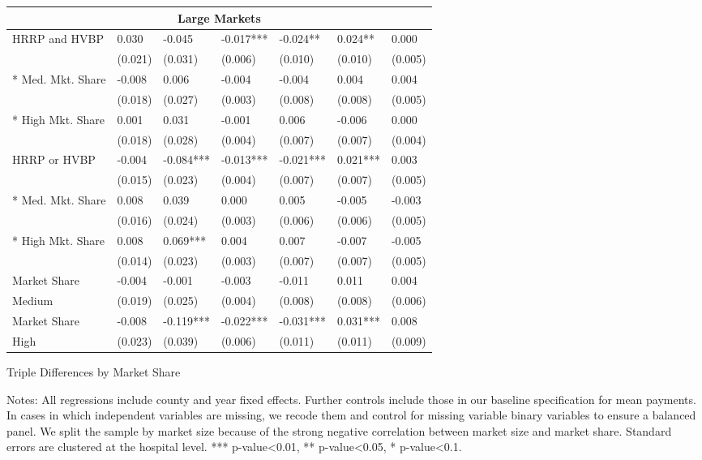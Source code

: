 \documentclass[12pt]{article}
\begin{document}
{\begin{tabular}{lllllll}
\multicolumn{7}{c}{Large Markets} \\
\hline
HRRP and HVBP   	&	0.030	&	-0.045	&	-0.017***	&	-0.024**	&	0.024**	&	0.000	\\
        	&	(0.021)	&	(0.031)	&	(0.006)	&	(0.010)	&	(0.010)	&	(0.005)	\\
\hspace{0.1in} * Med. Mkt. Share	&	-0.008	&	0.006	&	-0.004	&	-0.004	&	0.004	&	0.004	\\
        	&	(0.018)&	(0.027)	&	(0.003)	&	(0.008)	&	(0.008)	&	(0.005)	\\
\hspace{0.1in} * High Mkt. Share         	&	0.001	&	0.031	&	-0.001	&	0.006	&	-0.006	&	0.000	\\
        	&	(0.018)	&	(0.028)	&	(0.004)	&	(0.007)	&	(0.007)	&	(0.004)	\\
HRRP or HVBP	&	-0.004	&	-0.084***	&	-0.013***	&	-0.021***	&	0.021***	&	0.003	\\
        	&	(0.015)	&	(0.023)	&	(0.004)	&	(0.007)	&	(0.007)	&	(0.005)	\\
\hspace{0.1in} * Med. Mkt. Share	&	0.008	&	0.039	&	0.000	&	0.005	&	-0.005	&	-0.003	\\
        	&	(0.016)	&	(0.024)	&	(0.003)	&	(0.006)	&	(0.006)	&	(0.005)	\\
\hspace{0.1in} * High Mkt. Share        	&	0.008	&	0.069***	&	0.004	&	0.007	&	-0.007	&	-0.005	\\
        	&	(0.014)	&	(0.023)	&	(0.003)	&	(0.007)	&	(0.007)	&	(0.005)	\\
Market Share	&	-0.004	&	-0.001	&	-0.003	&	-0.011	&	0.011	&	0.004	\\
\hspace{0.1in} Medium	&	(0.019)	&	(0.025)	&	(0.004)	&	(0.008)	&	(0.008)&	(0.006)	\\
Market Share 	&	-0.008	&	-0.119***	&	-0.022***	&	-0.031***	&	0.031***	&	0.008	\\
\hspace{0.1in} High     	&	(0.023)	&	(0.039)	&	(0.006)	&	(0.011)	&	(0.011)	&	(0.009)	\\
\hline
\end{tabular}
}
\setlength{\captionmargin}{.5 \textwidth} \addtolength{\captionmargin}{-.5\wd\gfxbox}
\begin{table}[!h]
\centering
\caption{Triple Differences by Market Share}
\label{tab:bymktshare}
\usebox{\gfxbox}
\par
\begin{minipage}{\wd\gfxbox}
\footnotesize
Notes: All regressions include county and year fixed effects. Further controls include those in our baseline specification for mean payments.  In cases in which independent variables are missing, we recode them and control for missing variable binary variables to ensure a balanced panel.  We split the sample by market size because of the strong negative correlation between market size and market share. Standard errors are clustered at the hospital level.  *** p-value<0.01, ** p-value<0.05, * p-value<0.1.
\end{minipage}
\end{table}
\end{document}
